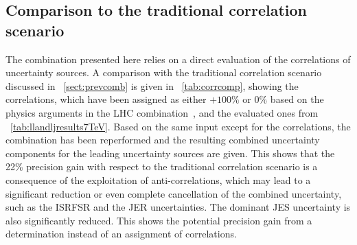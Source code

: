 \subsection{Comparison to the traditional correlation scenario}
%
The combination presented here relies on a direct evaluation of the correlations of uncertainty sources. A comparison with the traditional correlation scenario discussed in \sect~\ref{sect:prevcomb} is given in \tab~\ref{tab:corrcomp}, showing the correlations, which have been assigned as either $+100\%$ or $0\%$ based on the physics arguments in the \gls{LHC} combination~\cite{LHC2013}, and the evaluated ones from \tab~\ref{tab:llandljresults7TeV}. Based on the same input except for the correlations, the combination has been reperformed and the resulting combined uncertainty components for the leading uncertainty sources are given.
%
This shows that the 22\% precision gain with respect to the traditional correlation scenario is a consequence of the exploitation of anti-correlations, which may lead to a significant reduction or even complete cancellation of the combined uncertainty, such as the \gls{ISRFSR} and the \gls{JER} uncertainties. The dominant \gls{JES} uncertainty is also significantly reduced.
%
This shows the potential precision gain from a determination instead of an assignment of correlations.
%

